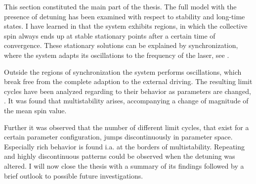 This section constituted the main part of the thesis. The full model with the presence of detuning has been examined with respect to stability and long-time states. I have learned in  that the system exhibits regions, in which the collective spin always ends up at stable stationary points after a certain time of convergence. These stationary solutions can be explained by synchronization, where the system adapts its oscillations to the frequency of the laser, see . 

Outside the regions of synchronization the system performs oscillations, which break free from the complete adaption to the external driving. The resulting limit cycles have been analyzed regarding to their behavior as parameters are changed, . It was found that multistability arises, accompanying a change of magnitude of the mean spin value. 

Further it was observed that the number of different limit cycles, that exist for a certain parameter configuration, jumps discontinuously in parameter space. Especially rich behavior is found i.a. at the borders of multistability. Repeating and highly discontinuous patterns could be observed when the detuning was altered. I will now close the thesis with a summary of its findings followed by a brief outlook to possible future investigations.


